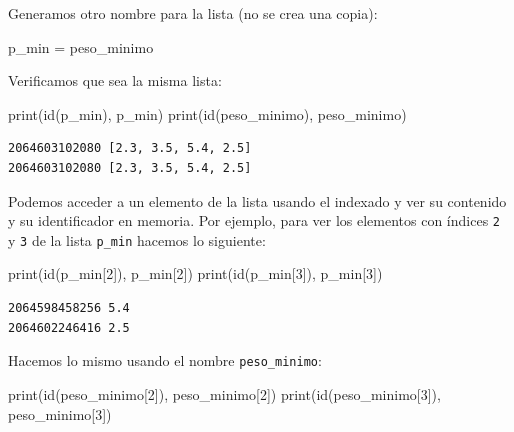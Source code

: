\documentclass[
  spanish,
  letterpaper,
]{scrbook}
\newenvironment{Shaded}{\begin{snugshade}}{\end{snugshade}}
\newcommand{\BuiltInTok}[1]{\textcolor[rgb]{0.00,0.23,0.31}{#1}}
\newcommand{\DecValTok}[1]{\textcolor[rgb]{0.68,0.00,0.00}{#1}}
\newcommand{\NormalTok}[1]{\textcolor[rgb]{0.00,0.23,0.31}{#1}}
\newcommand{\OperatorTok}[1]{\textcolor[rgb]{0.37,0.37,0.37}{#1}}
\theoremstyle{definition}
\theoremstyle{remark}
\begin{document}
Generamos otro nombre para la lista (no se crea una copia):

\begin{Shaded}
\begin{Highlighting}[]
\NormalTok{p\_min }\OperatorTok{=}\NormalTok{ peso\_minimo}
\end{Highlighting}
\end{Shaded}

Verificamos que sea la misma lista:

\begin{Shaded}
\begin{Highlighting}[]
\BuiltInTok{print}\NormalTok{(}\BuiltInTok{id}\NormalTok{(p\_min), p\_min)}
\BuiltInTok{print}\NormalTok{(}\BuiltInTok{id}\NormalTok{(peso\_minimo), peso\_minimo)}
\end{Highlighting}
\end{Shaded}

\begin{verbatim}
2064603102080 [2.3, 3.5, 5.4, 2.5]
2064603102080 [2.3, 3.5, 5.4, 2.5]
\end{verbatim}

Podemos acceder a un elemento de la lista usando el indexado y ver su
contenido y su identificador en memoria. Por ejemplo, para ver los
elementos con índices \texttt{2} y \texttt{3} de la lista
\texttt{p\_min} hacemos lo siguiente:

\begin{Shaded}
\begin{Highlighting}[]
\BuiltInTok{print}\NormalTok{(}\BuiltInTok{id}\NormalTok{(p\_min[}\DecValTok{2}\NormalTok{]), p\_min[}\DecValTok{2}\NormalTok{])}
\BuiltInTok{print}\NormalTok{(}\BuiltInTok{id}\NormalTok{(p\_min[}\DecValTok{3}\NormalTok{]), p\_min[}\DecValTok{3}\NormalTok{])}
\end{Highlighting}
\end{Shaded}

\begin{verbatim}
2064598458256 5.4
2064602246416 2.5
\end{verbatim}

Hacemos lo mismo usando el nombre \texttt{peso\_minimo}:

\begin{Shaded}
\begin{Highlighting}[]
\BuiltInTok{print}\NormalTok{(}\BuiltInTok{id}\NormalTok{(peso\_minimo[}\DecValTok{2}\NormalTok{]), peso\_minimo[}\DecValTok{2}\NormalTok{])}
\BuiltInTok{print}\NormalTok{(}\BuiltInTok{id}\NormalTok{(peso\_minimo[}\DecValTok{3}\NormalTok{]), peso\_minimo[}\DecValTok{3}\NormalTok{])}
\end{Highlighting}
\end{Shaded}
\end{document}
